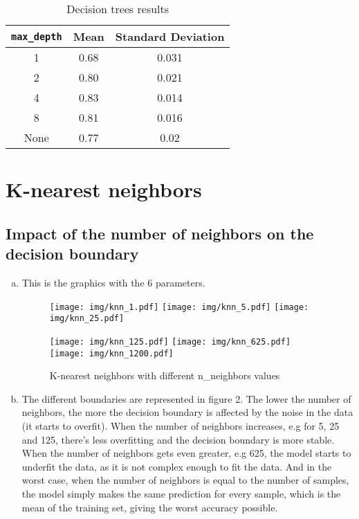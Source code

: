 \documentclass[12pt]{article}
\begin{document}
	\begin{table}[H]
		\centering
		\begin{tabular}{|c|c|c|}
		\hline
		\verb|max_depth| & Mean & Standard Deviation \\ \hline
		1                                & 0.68 & 0.031              \\ \hline
		2                                & 0.80 & 0.021              \\ \hline
		4                                & 0.83 & 0.014              \\ \hline
		8                                & 0.81 & 0.016              \\ \hline
		None                             & 0.77 & 0.02               \\ \hline
		\end{tabular}
		\caption{Decision trees results}
		\label{tab:results-dt}
		\end{table}

	
	


\section{K-nearest neighbors}
	\subsection{Impact of the number of neighbors on the decision boundary}
	\begin{enumerate}[a)]
		\item This is the graphics with the 6 parameters.
		\begin{figure}[H]
			\centering
			\texttt{[image: img/knn\_1.pdf]}\quad
			\texttt{[image: img/knn\_5.pdf]}\quad
			\texttt{[image: img/knn\_25.pdf]}\quad
			
			\medskip
			
			\texttt{[image: img/knn\_125.pdf]}\quad
			\texttt{[image: img/knn\_625.pdf]}\quad
			\texttt{[image: img/knn\_1200.pdf]}\quad
			
			\caption{K-nearest neighbors with different n\_neighbors values}
			\label{fig:knn}
		\end{figure}
		\item 
		The different boundaries are represented in figure 2. The lower the number of neighbors, the more the decision boundary is affected by the noise in the data (it starts to overfit). 
		When the number of neighbors increases, e.g for 5, 25 and 125, there's less overfitting and the decision boundary is more stable.
		When the number of neighbors gets even greater, e.g 625, the model starts to underfit the data, as it is not complex enough to fit the data.
		And in the worst case, when the number of neighbors is equal to the number of samples, the model simply makes the same prediction for every sample, which is the mean of the training set, giving the worst accuracy possible.
	\end{enumerate}
\end{document}
